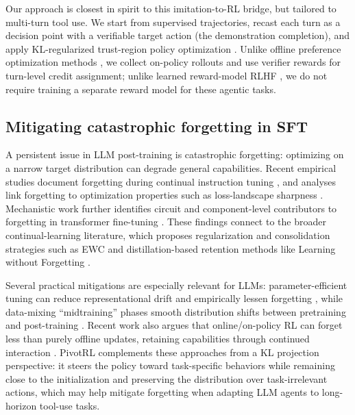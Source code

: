 Our approach is closest in spirit to this imitation-to-RL bridge, but tailored to multi-turn tool use.
We start from supervised trajectories, recast each turn as a decision point with a verifiable target action (the demonstration completion), and apply KL-regularized trust-region policy optimization \citep{schulman2017ppo,schulman2015trpo}.
Unlike offline preference optimization methods \citep{rafailov2023dpo,meng2024simpo}, we collect on-policy rollouts and use verifier rewards for turn-level credit assignment; unlike learned reward-model RLHF \citep{ouyang2022training,bai2022helpfulharmless}, we do not require training a separate reward model for these agentic tasks.



\subsection{Mitigating catastrophic forgetting in SFT}

A persistent issue in LLM post-training is catastrophic forgetting: optimizing on a narrow target distribution can degrade general capabilities.
Recent empirical studies document forgetting during continual instruction tuning \citep{luo2023empiricalCF}, and analyses link forgetting to optimization properties such as loss-landscape sharpness \citep{li2024revisitingCF}.
Mechanistic work further identifies circuit and component-level contributors to forgetting in transformer fine-tuning \citep{imanov2026mechanisticCF}.
These findings connect to the broader continual-learning literature, which proposes regularization and consolidation strategies such as EWC \citep{kirkpatrick2017ewc} and distillation-based retention methods like Learning without Forgetting \citep{li2016lwf}.

Several practical mitigations are especially relevant for LLMs: parameter-efficient tuning can reduce representational drift and empirically lessen forgetting \citep{biderman2024lora}, while data-mixing ``midtraining'' phases smooth distribution shifts between pretraining and post-training \citep{liu2025midtraining}.
Recent work also argues that online/on-policy RL can forget less than purely offline updates, retaining capabilities through continued interaction \citep{shenfeld2025rlsrazoronlinereinforcement,chen2025retainingdoingroleonpolicy}.
PivotRL complements these approaches from a KL projection perspective: it steers the policy toward task-specific behaviors while remaining close to the initialization and preserving the distribution over task-irrelevant actions, which may help mitigate forgetting when adapting LLM agents to long-horizon tool-use tasks.

